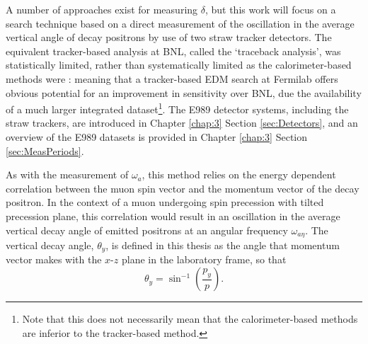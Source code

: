 A number of approaches exist for measuring $\delta$, but this work will focus on a search technique based on a direct measurement of the oscillation in the average vertical angle of decay positrons by use of two straw tracker detectors. The equivalent tracker-based analysis at BNL, called the `traceback analysis', was statistically limited, rather than systematically limited as the calorimeter-based methods were \cite{BNLEDM}: meaning that a tracker-based EDM search at Fermilab offers obvious potential for an improvement in sensitivity over BNL, due the availability of a much larger integrated dataset\footnote{Note that this does not necessarily mean that the calorimeter-based methods are inferior to the tracker-based method.}. The E989 detector systems, including the straw trackers, are introduced in Chapter \ref{chap:3} Section \ref{sec:Detectors}, and an overview of the E989 datasets is provided in Chapter \ref{chap:3} Section \ref{sec:MeasPeriods}.

As with the measurement of $\omega_{a}$, this method relies on the energy dependent correlation between the muon spin vector and the momentum vector of the decay positron. In the context of a muon undergoing spin precession with tilted precession plane, this correlation would result in an oscillation in the average vertical decay angle of emitted positrons at an angular frequency $\omega_{a\eta}$. The vertical decay angle, $\theta_{y}$, is defined in this thesis as the angle that momentum vector makes with the $x$-$z$ plane in the laboratory frame, so that 
%
\begin{equation}
  \theta_{y} = \sin^{-1}\left(\frac{p_{y}}{p}\right).
  \label{eqn:theta_y}
\end{equation}

